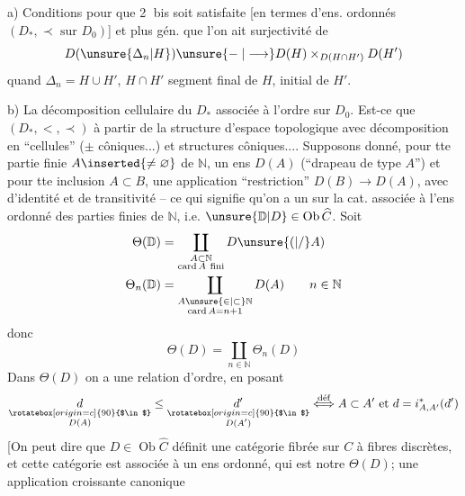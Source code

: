 a) Conditions pour que \textcircled{2 bis} soit satisfaite [en termes d'ens. ordonnés $(D_*,\prec\text{ sur }D_0)$] et plus gén. que l'on ait surjectivité de
\[
D(\unsure{\Delta_n|H})\unsure{\mathrel{-}|\longrightarrow}D(H)\mathbin{\times}_{D(H\cap H')}D(H')
\]
quand $\Delta_n=H\cup H'$, $H\cap H'$ segment final de $H$, initial de $H'$.

b) La décomposition cellulaire du \margin{$\Vert$} $D_*$ associée à l'ordre sur $D_0$. Est-ce que   $(D_*,<,\prec)$
à partir de la structure d'espace topologique  avec décomposition en ``cellules'' ($\pm$ côniques...) et structures côniques....
Supposons donné, pour tte partie finie $A\inserted{\ne\varnothing}$ de $\mathbb N$, un ens $D(A)$ (``drapeau de type $A$'') et pour tte inclusion $A\subset B$, une application ``restriction'' $D(B)\longrightarrow D(A)$, avec   d'identité et de transitivité --
ce qui signifie qu'on a un   sur la cat.  associée à l'ens ordonné des parties finies de $\mathbb N$, i.e. $\unsure{\mathbb D|D}\in\operatorname{Ob}\widehat C$.
 Soit
\[
\begin{aligned}
\Theta(\mathbb D)&=\coprod_{\substack{A\subset\mathbb N\\\operatorname{card}A\ \text{fini}}}D\unsure{(|/}A)\\
\Theta_n(\mathbb D)&=\coprod_{\substack{A\unsure{\in|\subset}\mathbb N\\\operatorname{card}A=n+1}}D(A)\qquad n\in\mathbb N
\end{aligned}
\]
donc
\[
\Theta(D)=\coprod_{n\in\mathbb N}\Theta_n(D)
\]
Dans $\Theta(D)$ on a une relation d'ordre, en posant
\[
\underset{\substack{\rotatebox[origin=c]{90}{$\in$}\\D(A)}}{d}\leq
\underset{\substack{\rotatebox[origin=c]{90}{$\in$}\\D(A')}}{d'}
\overset{\text{déf}}{\Longleftrightarrow}
 A\subset A'\text{ et }d=i_{A,A'}^*(d')
\]
[On peut dire que $D\in\operatorname{Ob}\widehat C$ définit une catégorie fibrée sur $C$ à fibres discrètes, et cette catégorie est associée à un ens ordonné, qui est notre $\Theta(D)$;  une application croissante canonique
